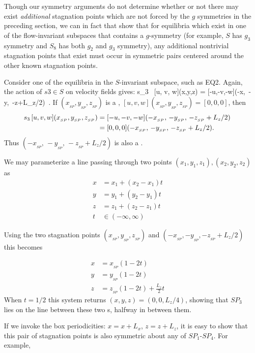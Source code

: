 \documentclass[letter,10pt,openany]{article}
\begin{document}
Though our symmetry arguments do not determine whether or not there may exist \textit{additional} stagnation points which are not forced by the $g$ symmetries in the preceding section, we can in fact that show that for equilibria which exist in one of the flow-invariant subspaces that contains a $g$-symmetry (for example, $S$ has $g_3$ symmetry and $S_8$ has both $g_2$ and $g_3$ symmetry), any additional nontrivial stagnation points that exist must occur in symmetric pairs centered around the other known stagnation points.

Consider one of the equilibria in the $S$-invariant subspace, such as EQ2. Again, the
 action of $s3 \in S$ on velocity fields gives:
 \beq    s_3 \, [u, v, w](x,y,z) = [-u,-v,-w](-x,\, -y,\, -z+L_z/2)\nnu\, .
 \eeq
 If $(x_{_{SP}},y_{_{SP}},z_{_{SP}})$ is a \stagp, $[u, v,
 w](x_{_{SP}},y_{_{SP}},z_{_{SP}}) = [0,0,0]$, then
 \begin{align} s_3 \, [u, v, w](x_{_{SP}},y_{_{SP}},z_{_{SP}}) &= [-u,-v,-w](-x_{_{SP}},\, -y_{_{SP}},\, -z_{_{SP}}+L_z/2) \nonumber\, \\
 &= [0,0,0](-x_{_{SP}},\, -y_{_{SP}},\, -z_{_{SP}}+L_z/2) .
 \end{align}
 Thus $(-x_{_{SP}},\, -y_{_{SP}},\, -z_{_{SP}}+L_z/2)$ is also a \stagp.


 \noindent We may parameterize a line passing through two points $(x_{1}, y_{1}, z_{1}),(x_{2}, y_{2}, z_{2})$
 as
 \begin{align}
  x &= x_{1} + (x_{2} - x_{1})t \\
  y &= y_{1} + (y_{2} - y_{1})t \\
  z &= z_{1} + (z_{2} - z_{1})t \\
  t &\in (-\infty,\infty)
 \end{align}
 
 Using the two stagnation points $(x_{_{SP}},y_{_{SP}},z_{_{SP}})$ and $(-x_{_{SP}},-y_{_{SP}},-z_{_{SP}} + L_z/2)$ this becomes
 
 \begin{align}
  x &= x_{_{SP}}(1-2t) \\
  y &= y_{_{SP}}(1-2t) \\
  z &= z_{_{SP}}(1-2t) + \frac{L_{z}}{2} t
 \end{align}
 When $t = 1/2$ this system returns $(x,y,z) = (0,0,L_{z}/4)$, showing
 that $SP_3$ lies on the line between these two \stagp s, halfway
 in between them.

 If we invoke the box periodicities: $x = x + L_{x}$, $z = z +
 L_{z}$, it is easy to show that this pair of stagnation points is also symmetric
 about any of $SP_1$-$SP_4$. For example, \\
\end{document}
